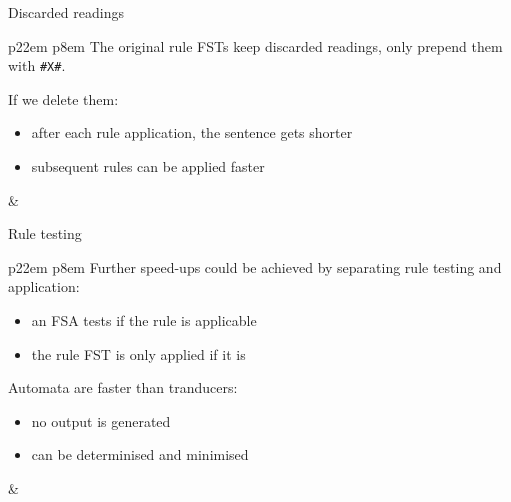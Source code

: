 \documentclass[utf8x,t,aspectratio=169,xcolor={dvipsnames}]{beamer}
\newcommand{\vitem}{\item \vspace{4pt}}
\begin{document}
\begin{frame}{Discarded readings}
\begin{tabular}{p{22em} p{8em}}
The original rule FSTs keep discarded readings, only prepend them with \texttt{\#X\#}.

\bigskip

If we delete them:
\begin{itemize}
    \vitem after each rule application, the sentence gets shorter
    \vitem subsequent rules can be applied faster
\end{itemize}
&
\end{tabular}

\end{frame}

\begin{frame}{Rule testing}
\begin{tabular}{p{22em} p{8em}}
Further speed-ups could be achieved by separating rule testing and application:
\begin{itemize}
    \vitem an FSA tests if the rule is applicable
    \vitem the rule FST is only applied if it is
\end{itemize}

\smallskip

Automata are faster than tranducers:
\begin{itemize}
    \vitem no output is generated
    \vitem can be determinised and minimised
\end{itemize}
&
\end{tabular}
\end{frame}
\end{document}
